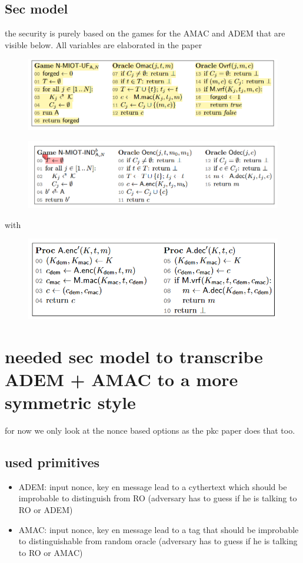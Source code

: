 \documentclass{article}
\begin{document}
\subsection{Sec model}
the security is purely based on the games for the AMAC and ADEM that are visible below. All variables are elaborated in the paper
\begin{figure}[H]
    \centering
    \includegraphics[scale = 0.5]{gebrabbel images/game mac.png}
\end{figure}
\begin{figure}[H]
    \centering
    \includegraphics[scale = 0.5]{gebrabbel images/game adem.png}
\end{figure}
with
\begin{figure}[H]
    \centering
    \includegraphics[scale = 0.5]{gebrabbel images/adem amac.png}
\end{figure}


\newpage
\section{needed sec model to transcribe ADEM + AMAC to a more symmetric style}
for now we only look at the nonce based options as the pkc paper does that too.
\subsection{used primitives}
\begin{itemize}
    \item ADEM: input nonce, key en message lead to a cythertext which should be improbable to distinguish from RO (adversary has to guess if he is talking to RO or ADEM)
    
    \item AMAC: input nonce, key en message lead to a tag that should be improbable to distinguishable from random oracle (adversary has to guess if he is talking to RO or AMAC)
\end{itemize}
\end{document}
